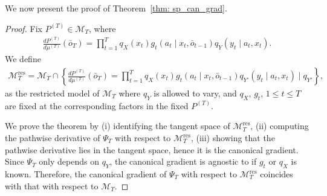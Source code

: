 \documentclass[11pt]{article}
\begin{document}
We now present the proof of Theorem~\ref{thm: sp_can_grad}. 
\begin{proof}
Fix $P^{(T)} \in \mathcal{M}_T$, where 
\begin{align*}
    \frac{dP^{(T)}}{d \mu^{(T)}}(\bar{o}_T) = \prod_{t=1}^{T}q_X(x_t)g_t(a_t\mid x_t, \bar{o}_{t-1})q_{Y}(y_t\mid a_t, x_t). 
\end{align*}
We define
\begin{align}
\label{def: stat_model_linear_well_spec_res}
    \mathcal{M}_T^{\mathrm{res}} = \mathcal{M}_T \cap \left\{    \frac{dP^{(T)}}{d \mu^{(T)}}(\bar{o}_T) = \prod_{t=1}^{T}q_X(x_t)g_t(a_t\mid x_t, \bar{o}_{t-1})q_{Y'}(y_t\mid a_t, x_t)\mid q_{Y'}\right\},
\end{align}
as the restricted model of $\mathcal{M}_T$ where $q_Y$ is allowed to vary, and $q_X$, $g_t$, $1\leq t\leq T$ are fixed at the corresponding factors in the fixed $P^{(T)}$. 

We prove the theorem by (i) identifying the tangent space of $\mathcal{M}_T^{\mathrm{res}}$, (ii) computing the pathwise derivative of $\Psi_T$ with respect to $\mathcal{M}_T^{\mathrm{res}}$, (iii) showing that the pathwise derivative lies in the tangent space, hence it is the canonical gradient.  Since $\Psi_T$ only depends on $q_{Y}$, the canonical gradient is agnostic to if $g_t$ or $q_X$ is known. Therefore, the canonical gradient of $\Psi_T$ with respect to $\mathcal{M}_T^{\mathrm{res}}$ coincides with that with respect to $\mathcal{M}_T$. 


\end{proof}
\end{document}
